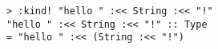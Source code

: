 \begin{repl}\begin{lstlisting}
> :kind! "hello " :<< String :<< "!"
"hello " :<< String :<< "!" :: Type
= "hello " :<< (String :<< "!")\end{lstlisting}\end{repl}
